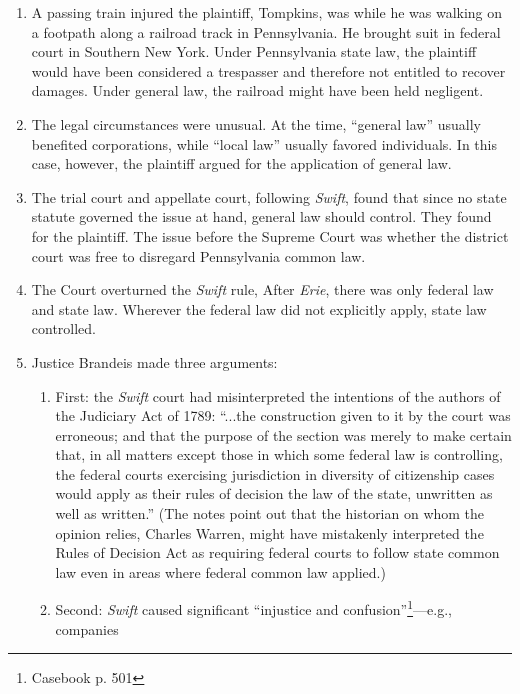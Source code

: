 \begin{enumerate}
    \item A passing train injured the plaintiff, Tompkins, was while he was 
    walking on a footpath along a railroad track in Pennsylvania. He brought 
    suit in federal court in Southern New York. Under Pennsylvania state law, 
    the plaintiff would have been considered a trespasser and therefore not 
    entitled to recover damages. Under general law, the railroad might have 
    been held negligent.
    \item The legal circumstances were unusual. At the time, ``general law'' 
    usually benefited corporations, while ``local law'' usually favored 
    individuals. In this case, however, the plaintiff argued for the 
    application of general law.
    \item The trial court and appellate court, following \emph{Swift}, found 
    that since no state statute governed the issue at hand, general law should 
    control. They found for the plaintiff. The issue before the Supreme Court 
    was whether the district court was free to disregard Pennsylvania common 
    law.
    \item The Court overturned the \emph{Swift} rule, After \emph{Erie}, there 
    was only federal law and state law. Wherever the federal law did not 
    explicitly apply, state law controlled.
    \item Justice Brandeis made three arguments:
    \begin{enumerate}
        \item First: the \emph{Swift} court had misinterpreted the intentions 
        of the authors of the Judiciary Act of 1789: ``...the construction 
        given to it by the court was erroneous; and that the purpose of the 
        section was merely to make certain that, in all matters except those 
        in which some federal law is controlling, the federal courts 
        exercising jurisdiction in diversity of citizenship cases would apply 
        as their rules of decision the law of the state, unwritten as well as 
        written.'' (The notes point out that the historian on whom the opinion 
        relies, Charles Warren, might have mistakenly interpreted the Rules of 
        Decision Act as requiring federal courts to follow state common law 
        even in areas where federal common law applied.)
        \item Second: \emph{Swift} caused significant ``injustice and 
        confusion''\footnote{Casebook p. 501}---e.g., companies 

\end{enumerate}
\end{enumerate}

